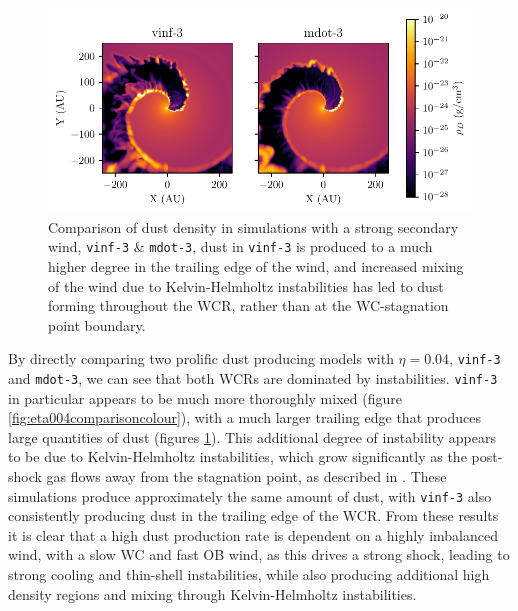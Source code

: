 \begin{figure}
  \centering
  \includegraphics{assets/results/mixed/eta-004-comparison-rhod.pdf}
  \caption[]{Comparison of dust density in simulations with a strong secondary wind, \texttt{vinf-3} \& \texttt{mdot-3}, dust in \texttt{vinf-3} is produced to a much higher degree in the trailing edge of the wind, and increased mixing of the wind due to Kelvin-Helmholtz instabilities has led to dust forming throughout the WCR, rather than at the WC-stagnation point boundary.}
  \label{fig:eta004comparisonrhod}
\end{figure}

By directly comparing two prolific dust producing models with $\eta = 0.04$, \texttt{vinf-3} and \texttt{mdot-3}, we can see that both WCRs are dominated by instabilities.
\texttt{vinf-3} in particular appears to be much more thoroughly mixed (figure \ref{fig:eta004comparisoncolour}), with a much larger trailing edge that produces large quantities of dust (figures \ref{fig:eta004comparisonrhod}).
This additional degree of instability appears to be due to Kelvin-Helmholtz instabilities, which grow significantly as the post-shock gas flows away from the stagnation point, as described in \textcite{stevens_colliding_1992}.
These simulations produce approximately the same amount of dust, with \texttt{vinf-3} also consistently producing dust in the trailing edge of the WCR.
From these results it is clear that a high dust production rate is dependent on a highly imbalanced wind, with a slow WC and fast OB wind, as this drives a strong shock, leading to strong cooling and thin-shell instabilities, while also producing additional high density regions and mixing through Kelvin-Helmholtz instabilities.


